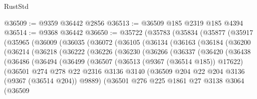 \begin{lexlean}{RustStd}
\begin{coremodule}
@36509 := @9359 @36442 @2856
@36513 := @36509 @185 @2319 @185 @4394
@36514 := @9368 @36442
@36650 := @35722
    (@35783
      (@35834
        (@35877
          (@35917
            (@35965
              (@36009
                (@36035
                  (@36072
                    (@36105
                      (@36134
                        (@36163
                          (@36184
                            (@36200
                              (@36214
                                (@36218
                                  (@36222
                                    (@36226
                                      (@36230
                                        (@36266
                                          (@36337
                                            (@36420
                                              (@36438
                                                (@36486
                                                  (@36494
                                                    (@36499
                                                      (@36507
                                                        (@36513 (@9367 (@36514 @185)) @17622)
                                                        (@36501
                                                          @274
                                                          @278
                                                          @22
                                                          @2316
                                                          @3136
                                                          @3140
                                                          (@36509
                                                            @204
                                                            @22
                                                            @204
                                                            @3136
                                                            (@9367 (@36514 @204))
                                                            @9889)
                                                          (@36501
                                                            @276
                                                            @225
                                                            @1861
                                                            @27
                                                            @3138
                                                            @3064
                                                            (@36509

\end{coremodule}
\end{lexlean}
